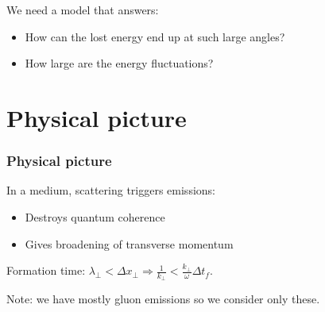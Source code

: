 \documentclass[pstricks,mathserif]{beamer}
\begin{document}
\begin{frame}
We need a model that answers:
\begin{itemize}
\item How can the lost energy end up at such large angles?
\item How large are the energy fluctuations?
\end{itemize}
\end{frame}

\section{Physical picture}

\begin{frame}
\frametitle{Physical picture}

{In a medium,} scattering triggers emissions:
\begin{itemize}
\item Destroys quantum coherence
\item Gives broadening of transverse momentum
\end{itemize}


Formation time: $\lambda_\perp<\Delta x_\perp \Rightarrow \frac{1}{k_\perp}<\frac{k_\perp}{\omega}\Delta t_f .$



\begin{center}


\end{center}

Note: we have mostly gluon emissions so we consider only these.

\end{frame}
\end{document}
